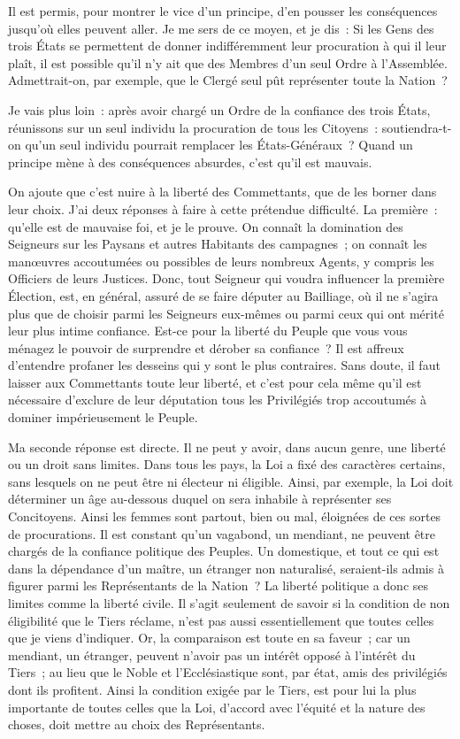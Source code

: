 \documentclass[french,twoside]{book} %
\begin{document}
Il est permis, pour montrer le vice d’un principe, d’en pousser les conséquences jusqu’où elles peuvent aller. Je me sers de ce moyen, et je dis : Si les Gens des trois États se permettent de donner indifféremment leur procuration à qui il leur plaît, il est possible qu’il n’y ait que des Membres d’un seul Ordre à l’Assemblée. Admettrait-on, par exemple, que le Clergé seul pût représenter toute la Nation ?\par
Je vais plus loin : après avoir chargé un Ordre de la confiance des trois États, réunissons sur un seul individu la procuration de tous les Citoyens : soutiendra-t-on qu’un seul individu pourrait remplacer les États-Généraux ? Quand un principe mène à des conséquences absurdes, c’est qu’il est mauvais.\par
On ajoute que c’est nuire à la liberté des Commettants, que de les borner dans leur choix. J’ai deux réponses à faire à cette prétendue difficulté. La première : qu’elle est de mauvaise foi, et je le prouve. On connaît la domination des Seigneurs sur les Paysans et autres Habitants des campagnes ; on connaît les manœuvres accoutumées ou possibles de leurs nombreux Agents, y compris les Officiers de leurs Justices. Donc, tout Seigneur qui voudra influencer la première Élection, est, en général, assuré de se faire députer au Bailliage, où il ne s’agira plus que de choisir parmi les Seigneurs eux-mêmes ou parmi ceux qui ont mérité leur plus intime confiance. Est-ce pour la liberté du Peuple que vous vous ménagez le pouvoir de surprendre et dérober sa confiance ? Il est affreux d’entendre profaner les desseins qui y sont le plus contraires. Sans doute, il faut laisser aux Commettants toute leur liberté, et c’est pour cela même qu’il est nécessaire d’exclure de leur députation tous les Privilégiés trop accoutumés à dominer impérieusement le Peuple.\par
Ma seconde réponse est directe. Il ne peut y avoir, dans aucun genre, une liberté ou un droit sans limites. Dans tous les pays, la Loi a fixé des caractères certains, sans lesquels on ne peut être ni électeur ni éligible. Ainsi, par exemple, la Loi doit déterminer un âge au-dessous duquel on sera inhabile à représenter ses Concitoyens. Ainsi les femmes sont partout, bien ou mal, éloignées de ces sortes de procurations. Il est constant qu’un vagabond, un mendiant, ne peuvent être chargés de la confiance politique des Peuples. Un domestique, et tout ce qui est dans la dépendance d’un maître, un étranger non naturalisé, seraient-ils admis à figurer parmi les Représentants de la Nation ? La liberté politique a donc ses limites comme la liberté civile. Il s’agit seulement de savoir si la condition de non éligibilité que le Tiers réclame, n’est pas aussi essentiellement que toutes celles que je viens d’indiquer. Or, la comparaison est toute en sa faveur ; car un mendiant, un étranger, peuvent n’avoir pas un intérêt opposé à l’intérêt du Tiers ; au lieu que le Noble et l’Ecclésiastique sont, par état, amis des privilégiés dont ils profitent. Ainsi la condition exigée par le Tiers, est pour lui la plus importante de toutes celles que la Loi, d’accord avec l’équité et la nature des choses, doit mettre au choix des Représentants.\par
\end{document}
